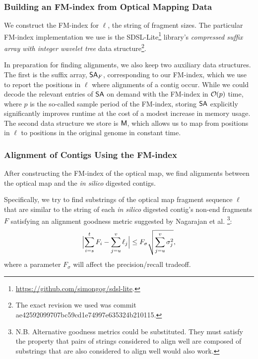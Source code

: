 \subsubsection{Building an FM-index from Optical Mapping Data}
\label{subsec-buildfm}



We construct the FM-index for $\ell$, the string of
fragment sizes.
The particular FM-index implementation we use is the SDSL-Lite\footnote{\url{https://github.com/simongog/sdsl-lite}.} \cite{SDSL}
library's \emph{compressed suffix array with integer wavelet tree} data structure\footnote{The exact revision we used was commit ae42592099707bc59cd1e74997e635324b210115.}.


In preparation for finding alignments, we also keep two auxiliary data structures. The first is the suffix array, $\mbox{\rm {\sf SA}}_F$, corresponding to our FM-index, which we use to report the positions in $\ell$ where alignments of a contig occur. While we could decode the relevant entries of $\mbox{\rm {\sf SA}}$ on demand with the FM-index in $\bigO(p)$ time, where $p$ is the so-called sample period of the FM-index, storing $\mbox{\rm {\sf SA}}$ explicitly significantly improves runtime at the cost of a modest increase in memory usage. The second data structure we store is $\mbox{\rm {\sf M}}$, which allows us to map from positions in $\ell$ to positions in the original genome in constant time.

\subsubsection{Alignment of Contigs Using the FM-index}
After constructing the FM-index of the optical map, we find alignments between the optical map and the \emph{in silico} digested contigs.


Specifically, we try to find substrings of the optical map fragment sequence $\ell$ that are similar to the string of each \emph{in silico} digested contig's non-end fragments $F$ satisfying an alignment goodness metric suggested by Nagarajan et al. \cite{Nagarajan08} \footnote{N.B. Alternative goodness metrics could be substituted.  They must satisfy the property that pairs of strings considered to align well are composed of substrings that are also considered to align well would also work.}:
\begin{displaymath}
\Bigl \lvert \sum_{i=s}^{t}F_i - \sum_{j=u}^{v}\ell_j \Bigr \rvert \le F_\sigma \sqrt{\sum_{j=u}^{v}\sigma_{j}^{2}},
\end{displaymath}
where a parameter $F_\sigma$  will affect the precision/recall tradeoff.



